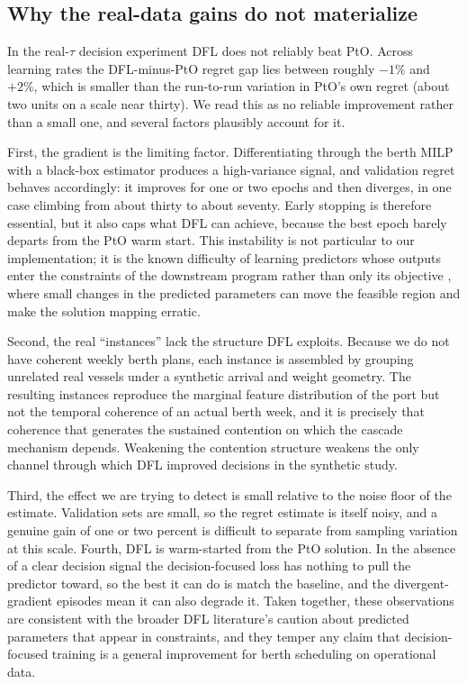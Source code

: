 \subsection{Why the real-data gains do not materialize}\label{sec:disc-realdata}

In the real-$\tau$ decision experiment DFL does not reliably beat PtO. Across
learning rates the DFL-minus-PtO regret gap lies between roughly $-1\%$ and
$+2\%$, which is smaller than the run-to-run variation in PtO's own regret
(about two units on a scale near thirty). We read this as no reliable
improvement rather than a small one, and several factors plausibly account for
it.

First, the gradient is the limiting factor. Differentiating through the berth
MILP with a black-box estimator produces a high-variance signal, and validation
regret behaves accordingly: it improves for one or two epochs and then diverges,
in one case climbing from about thirty to about seventy. Early stopping is
therefore essential, but it also caps what DFL can achieve, because the best
epoch barely departs from the PtO warm start. This instability is not particular
to our implementation; it is the known difficulty of learning predictors whose
outputs enter the constraints of the downstream program rather than only its
objective \citep{hu2023twostage, mandi2025feasibility}, where small changes in
the predicted parameters can move the feasible region and make the
solution mapping erratic.

Second, the real ``instances'' lack the structure DFL exploits. Because we do not
have coherent weekly berth plans, each instance is assembled by grouping
unrelated real vessels under a synthetic arrival and weight geometry. The
resulting instances reproduce the marginal feature distribution of the port but
not the temporal coherence of an actual berth week, and it is precisely that
coherence that generates the sustained contention on which the cascade mechanism
depends. Weakening the contention structure weakens the only channel through
which DFL improved decisions in the synthetic study.

Third, the effect we are trying to detect is small relative to the noise floor of
the estimate. Validation sets are small, so the regret estimate is itself noisy,
and a genuine gain of one or two percent is difficult to separate from sampling
variation at this scale. Fourth, DFL is warm-started from the PtO solution. In
the absence of a clear decision signal the decision-focused loss has nothing to
pull the predictor toward, so the best it can do is match the baseline, and the
divergent-gradient episodes mean it can also degrade it. Taken together, these
observations are consistent with the broader DFL literature's caution about
predicted parameters that appear in constraints, and they temper any claim that
decision-focused training is a general improvement for berth scheduling on
operational data.

